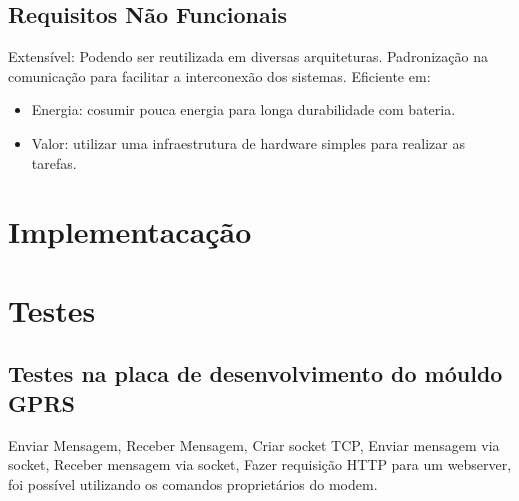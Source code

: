 \subsection{Requisitos N\~ao Funcionais}{

Extens\'ivel: Podendo ser reutilizada em diversas arquiteturas.
Padroniza\c{c}\~ao na comunica\c{c}\~ao para facilitar a interconex\~ao dos sistemas.
Eficiente em:
    \begin{itemize}
        \item Energia: cosumir pouca energia para longa durabilidade com bateria.
        \item Valor: utilizar uma infraestrutura de hardware simples para realizar as tarefas.
    \end{itemize}
}

\section{Implementaca\c{c}\~ao}
\section{Testes}
\subsection{Testes na placa de desenvolvimento do m\'ouldo GPRS}{
Enviar Mensagem, Receber Mensagem, Criar socket TCP, Enviar mensagem via socket, Receber mensagem via socket, Fazer requisi\c{c}\~ao HTTP para um webserver, foi poss\'ivel utilizando os comandos propriet\'arios do modem.}
